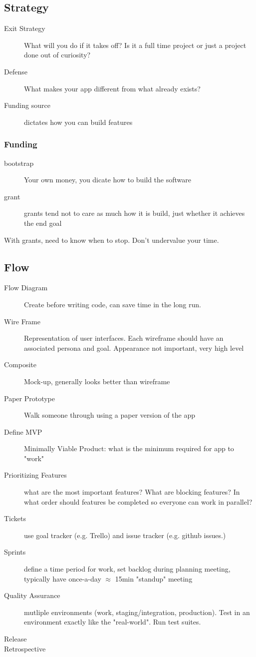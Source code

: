 \documentclass[12pt]{article}
\begin{document}
\subsection{Strategy}
\begin{description}
  \item [Exit Strategy] What will you do if it takes off?
    Is it a full time project or just a project done out of curiosity?
  \item [Defense] What makes your app different from what already exists?
  \item [Funding source] dictates how you can build features
\end{description}

\subsubsection{Funding}
\begin{description}
  \item [bootstrap] Your own money, you dicate how to build the software
  \item [grant] grants tend not to care as much how it is build, just whether
    it achieves the end goal
\end{description}
With grants, need to know when to stop. Don't undervalue your time.

\subsection{Flow}
\begin{description}
  \item[Flow Diagram] Create before writing code, can save time in the long run.
  \item[Wire Frame] Representation of user interfaces. Each wireframe should
    have an associated persona and goal. Appearance not important, very high
    level
  \item[Composite] Mock-up, generally looks better than wireframe
  \item[Paper Prototype] Walk someone through using a paper version of the app
  \item[Define MVP] Minimally Viable Product: what is the minimum required for
    app to "work"
  \item[Prioritizing Features] what are the most important features? What are
    blocking features? In what order should features be completed so everyone
    can work in parallel?
  \item[Tickets] use goal tracker (e.g. Trello) and issue tracker (e.g. github
    issues.)
  \item[Sprints] define a time period for work, set backlog during planning
    meeting, typically have once-a-day $\approx$ 15min "standup" meeting
  \item[Quality Assurance] mutliple environments (work, staging/integration,
    production). Test in an environment exactly like the "real-world". Run test
    suites.
  \item[Release]
  \item[Retrospective]
\end{description}
\end{document}

